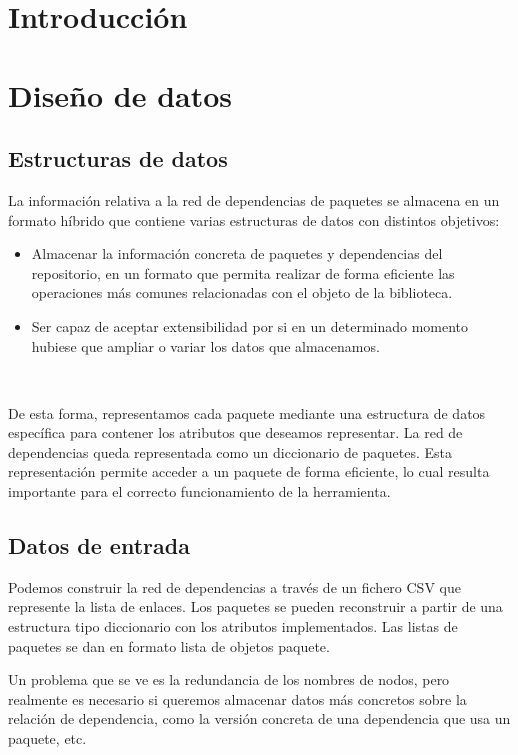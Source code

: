 
\section{Introducción}

\section{Diseño de datos}

\subsection{Estructuras de datos}
La información relativa a la red de dependencias de paquetes se almacena en un formato híbrido 
que contiene varias estructuras de datos con distintos objetivos:

\begin{itemize}
\item Almacenar la información concreta de paquetes y dependencias del repositorio, en un formato 
que permita realizar de forma eficiente las operaciones más comunes relacionadas con el objeto 
de la biblioteca.

\item Ser capaz de aceptar extensibilidad por si en un determinado momento hubiese que ampliar 
o variar los datos que almacenamos.
\end{itemize}
\

De esta forma, representamos cada paquete mediante una estructura de datos específica para 
contener los atributos que deseamos representar. La red de dependencias queda representada 
como un diccionario de paquetes. Esta representación permite acceder a un paquete de forma 
eficiente, lo cual resulta importante para el correcto funcionamiento de la herramienta.

\subsection{Datos de entrada}

Podemos construir la red de dependencias a través de un fichero CSV que represente la lista 
de enlaces. Los paquetes se pueden reconstruir a partir de una estructura tipo diccionario 
con los atributos implementados. Las listas de paquetes se dan en formato lista de objetos 
paquete.

Un problema que se ve es la redundancia de los nombres de nodos, pero realmente es necesario 
si queremos almacenar datos más concretos sobre la relación de dependencia, como la versión 
concreta de una dependencia que usa un paquete, etc.

